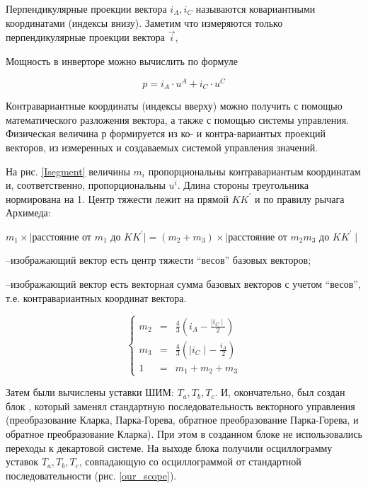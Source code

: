 \documentclass[a4paper]{article}
\begin{document}
Перпендикулярные проекции вектора $i_A, i_C$ называются ковариантными координатами (индексы внизу). Заметим что измеряются только перпендикулярные проекции вектора $\vec{i}$,



Мощность в инверторе можно вычислить по формуле

\begin{equation}
p = i_A\cdot u^A + i_C\cdot u^C
\end{equation}

Контравариантные координаты (индексы вверху) можно получить с помощью математического разложения вектора, а также с помощью системы управления.
Физическая величина $р$ формируется из ко- и контра-вариантых проекций векторов, из измеренных и создаваемых системой управления значений. 



На рис. \ref{Isegment} величины $m_i$ пропорциональны контравариантым координатам и, соответственно, пропорциональны $u^i$. 
Длина стороны треугольника нормирована на 1.  Центр тяжести лежит на прямой $KK^\prime$ и по правилу рычага Архимеда:

\noindent$m_1\times\mid\!\text{расстояние от }m_1\text{ до }KK^\prime\!\mid = (m_2+m_3)\times\mid\!\text{расстояние от }m_2m_3\text{ до }KK^\prime\!\mid$

\noindent --изображающий вектор есть центр тяжести \enquote{весов} базовых векторов;

\noindent --изображающий вектор есть векторная сумма базовых векторов с учетом \enquote{весов}, т.е. контравариантных координат вектора.



$$
        \left\{
        \begin{array}{lcl}
                m_2 &=& \frac{4}{3}\left(i_A - \frac{\mid i_C\mid}{2}\right) \\
                m_3 &=& \frac{4}{3}\left(\mid i_C\mid - \;\frac{i_A}{2}\right) \\
                1 &=& m_1 + m_2 + m_3
        \end{array}
        \right.
$$

Затем были вычислены уставки ШИМ: $T_a, T_b, T_c$. И, окончательно, был создан блок \cite{CodeBlock}, который заменял стандартную последовательность векторного управления (преобразование Кларка, Парка-Горева,
обратное преобразование Парка-Горева, и обратное преобразование Кларка). 
При этом в созданном блоке не использовались переходы к декартовой системе.
На выходе блока получили осциллограмму уставок $T_a, T_b, T_c$, совпадающую со осциллограммой от стандартной последовательности (рис. \ref{our_scope}).
\end{document}
